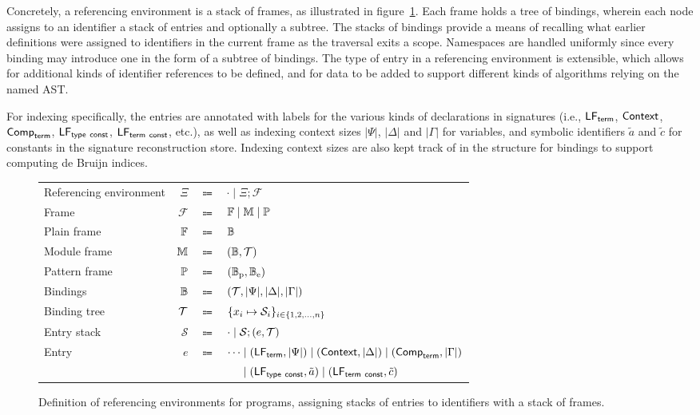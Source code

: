 Concretely, a referencing environment is a stack of frames, as illustrated in figure~\ref{figure:referencing-environment-definition}.
Each frame holds a tree of bindings, wherein each node assigns to an identifier a stack of entries and optionally a subtree.
The stacks of bindings provide a means of recalling what earlier definitions were assigned to identifiers in the current frame as the traversal exits a scope.
Namespaces are handled uniformly since every binding may introduce one in the form of a subtree of bindings.
The type of entry in a referencing environment is extensible, which allows for additional kinds of identifier references to be defined, and for data to be added to support different kinds of algorithms relying on the named \ac{AST}.

For indexing specifically, the entries are annotated with labels for the various kinds of declarations in \Beluga signatures (i.e., $\mathsf{LF}_{\mathsf{term}}$, $\mathsf{Context}$, $\mathsf{Comp}_{\mathsf{term}}$, $\mathsf{LF}_{\mathsf{type\ const}}$, $\mathsf{LF}_{\mathsf{term\ const}}$, etc.), as well as indexing context sizes $|\Psi|$, $|\Delta|$ and $|\Gamma|$ for variables, and symbolic identifiers $\tilde a$ and $\tilde c$ for constants in the signature reconstruction store.
Indexing context sizes are also kept track of in the structure for bindings to support computing de Bruijn indices.

\begin{figure}[H]
\centering
{\footnotesize
\begin{tabular}{lrcl}
Referencing environment & $\Xi$ & $\Coloneqq$ & $ \cdot \mid \Xi; \mathcal{F} $\\
Frame & $ \mathcal{F} $ & $ \Coloneqq $ & $ \mathbb{F} \mid \mathbb{M} \mid \mathbb{P} $\\
Plain frame & $ \mathbb{F} $ & $ \Coloneqq $ & $ \mathbb{B} $\\
Module frame & $ \mathbb{M} $ & $ \Coloneqq $ & $ (\mathbb{B}, \mathcal{T}) $\\
Pattern frame & $ \mathbb{P} $ & $ \Coloneqq $ & $ (\mathbb{B}_{\text{p}}, \mathbb{B}_{\text{e}}) $\\
Bindings & $ \mathbb{B} $ & $ \Coloneqq $ & $ (\mathcal{T}, |\Psi|, |\Delta|, |\Gamma|) $\\
Binding tree & $ \mathcal{T} $ & $ \Coloneqq $ & $ \{x_i \mapsto \mathcal{S}_i\}_{i \in \{1, 2, \dots, n\}} $\\
Entry stack & $ \mathcal{S} $ & $ \Coloneqq $ & $ \cdot \mid \mathcal{S}; (e, \mathcal{T}) $\\
Entry & $ e $ & $ \Coloneqq $ & $ \cdots \mid (\mathsf{LF}_{\mathsf{term}}, |\Psi|) \mid (\mathsf{Context}, |\Delta|) \mid (\mathsf{Comp}_{\mathsf{term}}, |\Gamma|) $\\
&&& $ \phantom{\cdots} \mid (\mathsf{LF}_{\mathsf{type\ const}}, \tilde a) \mid (\mathsf{LF}_{\mathsf{term\ const}}, \tilde c) $
\end{tabular}
}
\caption[Definition of referencing environments for \Beluga programs]{%
Definition of referencing environments for \Beluga programs, assigning stacks of entries to identifiers with a stack of frames.
}
\label{figure:referencing-environment-definition}
\end{figure}

